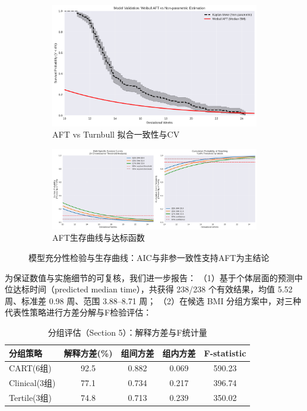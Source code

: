 \documentclass[withoutpreface]{cumcmthesis}
\begin{document}
\begin{figure}[htbp]
\centering
\begin{subfigure}{0.48\textwidth}
  \centering
  \includegraphics[width=\linewidth]{output/figures/p2_model_validation.png}
  \caption{AFT vs Turnbull 拟合一致性与CV}
\end{subfigure}\hfill
\begin{subfigure}{0.48\textwidth}
  \centering
  \includegraphics[width=\linewidth]{output/figures/p2_survival_curves_aft.png}
  \caption{AFT生存曲线与达标函数}
\end{subfigure}
\caption{模型充分性检验与生存曲线：AIC与非参一致性支持AFT为主结论}
\label{fig:p2_validation_survival}
\end{figure}

为保证数值与实施细节的可复核，我们进一步报告：
（1）基于个体层面的预测中位达标时间（predicted median time），共获得 \num{238}/\num{238} 个有效结果，均值 \num{5.52} 周、标准差 \num{0.98} 周、范围 \num{3.88}–\num{8.71} 周；
（2）在候选 BMI 分组方案中，对三种代表性策略进行方差分解与F检验评估：

\begin{table}[htbp]
\centering
\caption{分组评估（Section 5）：解释方差与F统计量}
\label{tab:p2_group_eval}
\begin{tabular}{@{}lcccc@{}}
\toprule
分组策略 & 解释方差(\%) & 组间方差 & 组内方差 & F-statistic \\
\midrule
CART(6组) & 92.5 & 0.882 & 0.069 & 590.23 \\
Clinical(3组) & 77.1 & 0.734 & 0.217 & 396.74 \\
Tertile(3组) & 74.8 & 0.713 & 0.239 & 350.02 \\
\bottomrule
\end{tabular}
\end{table}
\end{document}
